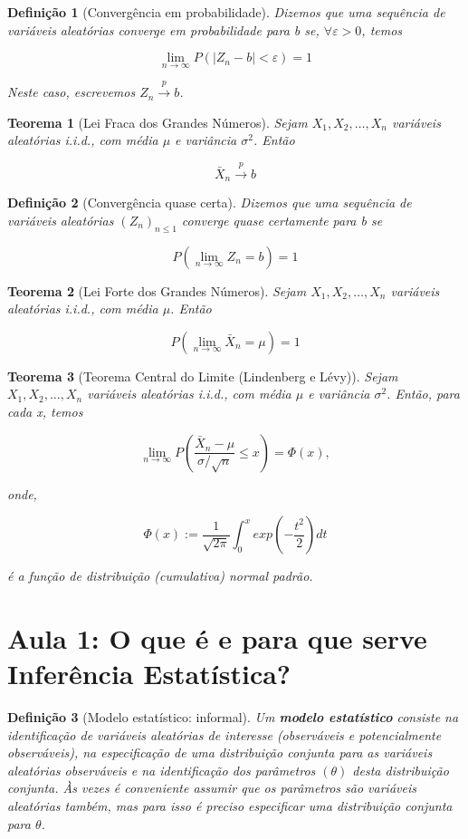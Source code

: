 \documentclass{article}
\newtheorem{theorem}{Teorema}
\newtheorem{definition}{Definição}
\begin{document}
\begin{definition}[Convergência em probabilidade]
Dizemos que uma sequência de variáveis aleatórias converge em probabilidade para b se, $\forall \varepsilon > 0$, temos

$$\lim_{n \to \infty} P(|Z_n - b| < \varepsilon) = 1$$

Neste caso, escrevemos $Z_n \xrightarrow{p} b$.
\end{definition}

\begin{theorem}[Lei Fraca dos Grandes Números]
Sejam $X_1, X_2, \ldots, X_n$ variáveis aleatórias i.i.d., com média $\mu$ e variância $\sigma^2$. Então

$$\bar{X}_n \xrightarrow{p} b$$
\end{theorem}

\begin{definition}[Convergência quase certa]
Dizemos que uma sequência de variáveis aleatórias $(Z_n)_{n \leq 1}$ converge quase certamente para b se

$$P(\lim_{n \to \infty} Z_n = b) = 1$$
\end{definition}

\begin{theorem}[Lei Forte dos Grandes Números]
Sejam $X_1, X_2, \ldots, X_n$ variáveis aleatórias i.i.d., com média $\mu$. Então

$$P(\lim_{n \to \infty} \bar{X}_n = \mu) = 1$$
\end{theorem}

\begin{theorem}[Teorema Central do Limite (Lindenberg e Lévy)]
Sejam $X_1, X_2, \ldots, X_n$ variáveis aleatórias i.i.d., com média $\mu$ e variância $\sigma^2$. Então, para cada x, temos

$$\lim_{n \to \infty} P \left ( \frac{\bar{X}_n - \mu}{\sigma / \sqrt{n}} \leq x \right ) = \Phi(x),$$

onde,

$$\Phi(x) := \frac{1}{\sqrt{2 \pi}} \int_0^x exp \left(- \frac{t^2}{2} \right) d t$$

é a função de distribuição (cumulativa) normal padrão.
\end{theorem}

\section*{Aula 1: O que é e para que serve Inferência Estatística?}
\label{s1}

\begin{definition}[Modelo estatístico: informal]
Um \textbf{modelo estatístico} consiste na identificação de variáveis aleatórias de interesse (observáveis e potencialmente observáveis), na especificação de uma distribuição conjunta para as variáveis aleatórias observáveis e na identificação dos parâmetros $(\theta)$ desta distribuição conjunta. Às vezes é conveniente assumir que os parâmetros são variáveis aleatórias também, mas para isso é preciso especificar uma distribuição conjunta para $\theta$.
\end{definition}
\end{document}

